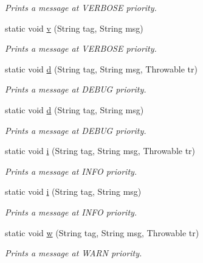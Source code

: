 \begin{DoxyCompactItemize}
\begin{DoxyCompactList}\small\item\em Prints a message at V\+E\+R\+B\+O\+SE priority. \end{DoxyCompactList}\item 
static void \hyperlink{classcom_1_1toast_1_1android_1_1gamebase_1_1base_1_1log_1_1_logger_ae07d1a03ee97d15c0d205633497ea327}{v} (String tag, String msg)
\begin{DoxyCompactList}\small\item\em Prints a message at V\+E\+R\+B\+O\+SE priority. \end{DoxyCompactList}\item 
static void \hyperlink{classcom_1_1toast_1_1android_1_1gamebase_1_1base_1_1log_1_1_logger_ac92000722506d61f323e53319c3d75b0}{d} (String tag, String msg, Throwable tr)
\begin{DoxyCompactList}\small\item\em Prints a message at D\+E\+B\+UG priority. \end{DoxyCompactList}\item 
static void \hyperlink{classcom_1_1toast_1_1android_1_1gamebase_1_1base_1_1log_1_1_logger_af4bcd771ce8eb05ccff9b8ae421dbe32}{d} (String tag, String msg)
\begin{DoxyCompactList}\small\item\em Prints a message at D\+E\+B\+UG priority. \end{DoxyCompactList}\item 
static void \hyperlink{classcom_1_1toast_1_1android_1_1gamebase_1_1base_1_1log_1_1_logger_a116916f0b74dee7353299a061e6e73b1}{i} (String tag, String msg, Throwable tr)
\begin{DoxyCompactList}\small\item\em Prints a message at I\+N\+FO priority. \end{DoxyCompactList}\item 
static void \hyperlink{classcom_1_1toast_1_1android_1_1gamebase_1_1base_1_1log_1_1_logger_a7cd0a94de5c27beee2da674bfcccfece}{i} (String tag, String msg)
\begin{DoxyCompactList}\small\item\em Prints a message at I\+N\+FO priority. \end{DoxyCompactList}\item 
static void \hyperlink{classcom_1_1toast_1_1android_1_1gamebase_1_1base_1_1log_1_1_logger_af39c88dd6f05a7752d16c7de3f48bf46}{w} (String tag, String msg, Throwable tr)
\begin{DoxyCompactList}\small\item\em Prints a message at W\+A\+RN priority. \end{DoxyCompactList}\item 

\end{DoxyCompactItemize}
